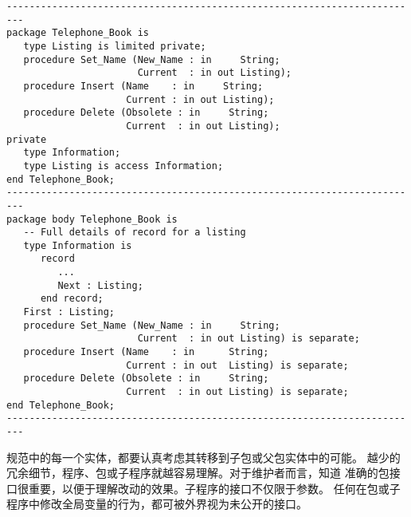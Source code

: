 \begin{lstlisting}
-------------------------------------------------------------------------
package Telephone_Book is
   type Listing is limited private;
   procedure Set_Name (New_Name : in     String;
                       Current  : in out Listing);
   procedure Insert (Name    : in     String;
                     Current : in out Listing);
   procedure Delete (Obsolete : in     String;
                     Current  : in out Listing);
private
   type Information;
   type Listing is access Information;
end Telephone_Book;
-------------------------------------------------------------------------
package body Telephone_Book is
   -- Full details of record for a listing
   type Information is
      record
         ...
         Next : Listing;
      end record;
   First : Listing;
   procedure Set_Name (New_Name : in     String;
                       Current  : in out Listing) is separate;
   procedure Insert (Name    : in      String;
                     Current : in out  Listing) is separate;
   procedure Delete (Obsolete : in     String;
                     Current  : in out Listing) is separate;
end Telephone_Book;
-------------------------------------------------------------------------
\end{lstlisting}

\begin{blockindent}
规范中的每一个实体，都要认真考虑其转移到子包或父包实体中的可能。
越少的冗余细节，程序、包或子程序就越容易理解。对于维护者而言，知道
准确的包接口很重要，以便于理解改动的效果。子程序的接口不仅限于参数。
任何在包或子程序中修改全局变量的行为，都可被外界视为未公开的接口。
\end{blockindent}
